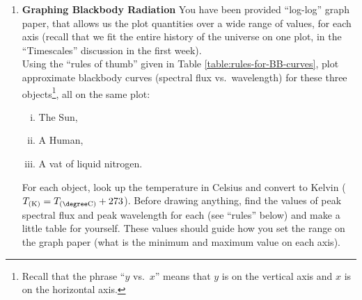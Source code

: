\documentclass[12pt]{article}
\begin{document}
\begin{enumerate}

\item {\bf Graphing Blackbody Radiation} You have been provided ``log-log'' graph paper, that allows us the plot quantities over a wide range of values, for each axis (recall that we fit the entire history of the universe on one plot, in the ``Timescales'' discussion in the first week). \\[-6pt]

Using the ``rules of thumb'' given in Table \ref{table:rules-for-BB-curves}, plot approximate blackbody curves (spectral flux  vs.\ wavelength) for these three objects\footnote{Recall that the phrase ``$y$ vs.\ $x$'' means that $y$ is on the vertical axis and $x$ is on the horizontal axis.}, all on the same plot:
	\begin{enumerate}[(i)]
	\item The Sun,
	\item A Human,
	\item A vat of liquid nitrogen.
	\end{enumerate}
For each object, look up the temperature in Celsius and convert to Kelvin ($T_{(\text{K})} = T_{(\degree \text{C})} + 273$). Before drawing anything, find the values of peak spectral flux and peak wavelength for each (see ``rules'' below) and make a little table for yourself.  These values should guide how you set the range on the graph paper (what is the minimum and maximum value on each axis).   
	\begin{table}[t]
	\centering
\end{table}
\end{enumerate}
\end{document}
